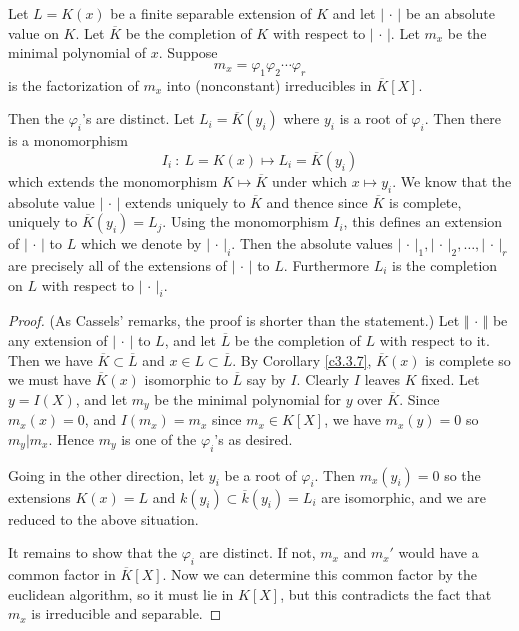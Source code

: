 \begin{theo}
\label{t3.3.6}
Let $L=K(x)$ be a finite separable extension of $K$ and let $|\, \cdot\, |$ be an absolute value on $K$. Let $\overline{K}$ be the completion of $K$ with respect to $|\, \cdot\, |$. Let $m_{x}$ be the minimal polynomial of $x$. Suppose
$$
m_{x}=\varphi_{1}\varphi_{2}\cdots\varphi_{r}
$$
is the factorization of $m_{x}$ into (nonconstant) irreducibles in $\overline{K}[X]$.

Then the $\varphi_{i}$'s are distinct. Let $L_{i}=\overline{K}(y_{i})$ where $y_{i}$ is a root of $\varphi_{i}$. Then there is a monomorphism
$$
I_{i}\ :\ L=K(x)\mapsto L_{i}=\overline{K}(y_{i})
$$
which extends the monomorphism $K\mapsto\overline{K}$ under which $x\mapsto y_{i}$.  We know that the absolute value $|\, \cdot\, |$ extends uniquely to $\overline{K}$ and thence since $\overline{K}$ is complete, uniquely to $\overline{K}(y_{i})=L_{j}$. Using the monomorphism $I_{i}$, this defines an extension of $|\, \cdot\, |$ to $L$ which we denote by $|\, \cdot\, |_{i}$. Then the absolute values $|\, \cdot\, |_1, |\, \cdot\, |_2, \ldots, |\, \cdot\, |_{r}$ are precisely all of the extensions of $|\, \cdot\, |$ to $L$. Furthermore $L_{i}$ is the completion on $L$ with respect to $|\, \cdot\, |_{i}$.
\end{theo}

\begin{proof}
(As Cassels' remarks, the proof is shorter than the statement.) Let $\Vert\, \cdot\, \Vert$ be any extension of $|\, \cdot\, |$ to $L$, and let $\overline{L}$ be the completion of $L$ with respect to it. Then we have $\overline{K}\subset\overline{L}$ and $x\in L\subset\overline{L}$. By Corollary \ref{c3.3.7}, $\overline{K}(x)$ is complete so we must have $\overline{K}(x)$ isomorphic to $\overline{L}$ say by $I$. Clearly $I$ leaves $K$ fixed. Let $y=I(X)$, and let $m_{y}$ be the minimal polynomial for $y$ over $\overline{K}$. Since $m_{x}(x)=0$, and $I(m_{x})=m_{x}$ since $m_{x}\in K[X]$, we have $m_{x}(y)=0$ so $m_{y}|m_{x}$. Hence $m_{y}$ is one of the $\varphi_{i}$'s as desired.

Going in the other direction, let $y_{i}$ be a root of $\varphi_{i}$. Then $m_{x}(y_{i})=0$ so the extensions $K(x)=L$ and $k(y_{i})\subset\overline{k}(y_{i})=L_{i}$ are isomorphic, and we are reduced to the above situation.

It remains to show that the $\varphi_{i}$ are distinct. If not, $m_{x}$ and $m_{x}'$ would have a common factor in $\overline{K}[X]$. Now we can determine this common factor by the euclidean algorithm, so it must lie in $K[X]$, but this contradicts the fact that $m_{x}$ is irreducible and separable.
\end{proof}

